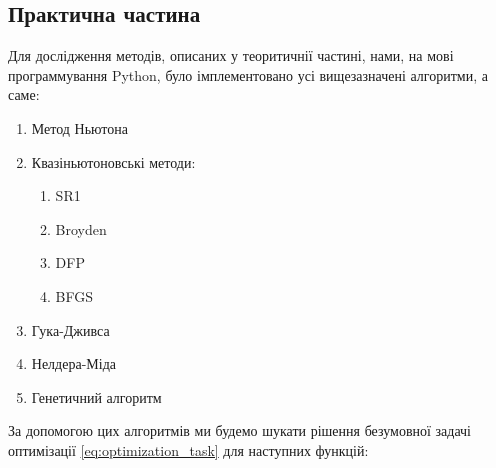 \begin{center}
    \section*{Практична частина}
\end{center}

Для дослідження методів, описаних у теоритичнії
частині, нами, на мові программування Python, було імплементовано усі вищезазначені алгоритми,
а саме:
\vspace{0.25cm}
\begin{enumerate}
    \item Метод Ньютона
    \item Квазіньютоновські методи:
    \begin{enumerate}
        \item SR1
        \item Broyden
        \item DFP
        \item BFGS
    \end{enumerate}
    \item Гука-Дживса
    \item Нелдера-Міда
    \item Генетичний алгоритм
\end{enumerate}

За допомогою цих алгоритмів ми будемо шукати
рішення безумовної задачі оптимізації \ref{eq:optimization_task}
для наступних функцій:

